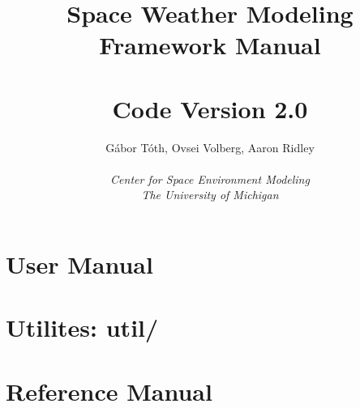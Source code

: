 \documentclass[twoside,10pt]{book}
\title{Space Weather Modeling Framework Manual \\ 
       \hfill \\
       \large Code Version 2.0}
\author{G\'abor T\'oth, Ovsei Volberg, Aaron Ridley\\
       \hfill \\
       {\it Center for Space Environment Modeling}\\
       {\it The University of Michigan}}
\begin{document}
\pagestyle{fancy}
\lhead[\fancyplain{}{\bfseries\thepage}]{\fancyplain{}{\bfseries\rightmark}}
\rhead[\fancyplain{}{\bfseries\leftmark}]{\fancyplain{}{\bfseries\thepage}}
\cfoot{}

\maketitle

\tableofcontents



\chapter{User Manual}









\chapter{Utilites: util/}



\chapter{Reference Manual}




\end{document}
